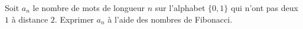 Soit $a_n$ le nombre de mots de longueur $n$ sur l'alphabet $\{0, 1\}$ qui n'ont pas deux $1$ à distance $2$. Exprimer $a_n$ à l'aide des nombres de Fibonacci.
